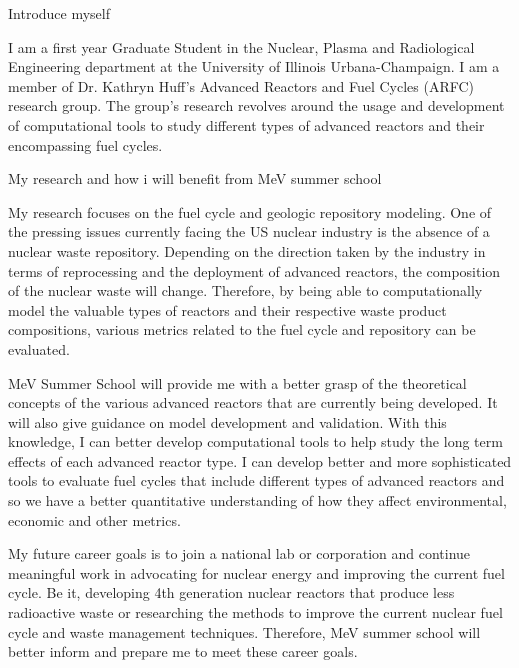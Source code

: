 \documentclass{resume2} %
\begin{document}
\vspace{1cm}
\onehalfspacing
Introduce myself 

I am a first year Graduate Student in the Nuclear, Plasma and Radiological Engineering department at the University of Illinois Urbana-Champaign. I am a member of Dr. Kathryn Huff's Advanced Reactors and Fuel Cycles (ARFC) research group. The group's research revolves around the usage and development of computational tools to study different types of advanced reactors and their encompassing fuel cycles. 

My research and how i will benefit from MeV summer school 

My research focuses on the fuel cycle and geologic repository modeling. One of the pressing issues currently facing the US nuclear industry is the absence of a nuclear waste repository. Depending on the direction taken by the industry in terms of reprocessing and the deployment of advanced reactors, the composition of the nuclear waste will change. Therefore, by being able to computationally model the valuable types of reactors and their respective waste product compositions, various metrics related to the fuel cycle and repository can be evaluated. 

MeV Summer School will provide me with a better grasp of the theoretical concepts of the various advanced reactors that are currently being developed. It will also give guidance on model development and validation. With this knowledge, I can better develop computational tools to help study the long term effects of each advanced reactor type. I can develop better and more sophisticated tools to evaluate fuel cycles that include different types of advanced reactors and so we have a better quantitative understanding of how they affect environmental, economic and other metrics.

My future career goals is to join a national lab or corporation and continue meaningful work in advocating for nuclear energy and improving the current fuel cycle. Be it, developing 4th generation nuclear reactors that produce less radioactive waste or researching the methods to improve the current nuclear fuel cycle and waste management techniques. Therefore, MeV summer school will better inform and prepare me to meet these career goals. 
\end{document}
